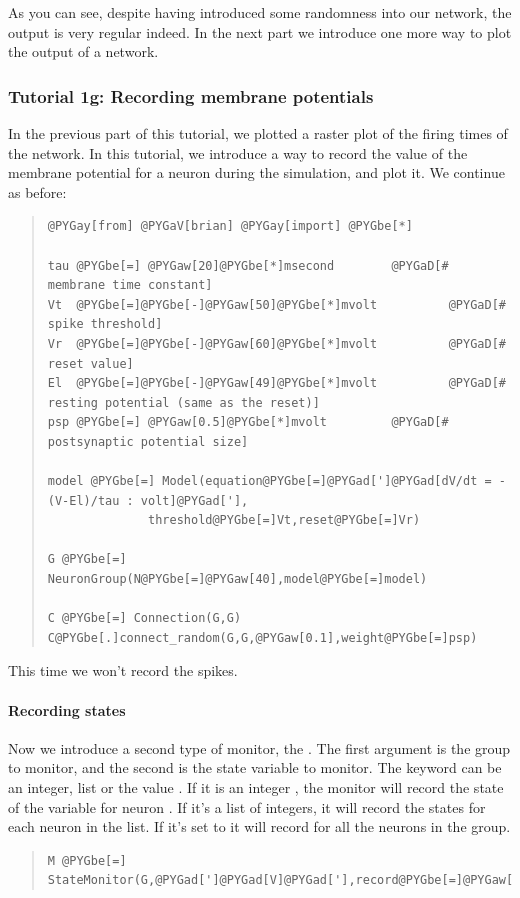 \documentclass[letterpaper,10pt]{manual}
\begin{document}
As you can see, despite having introduced some randomness into
our network, the output is very regular indeed. In the next part
we introduce one more way to plot the output of a network.

\resetcurrentobjects


\subsubsection{Tutorial 1g: Recording membrane potentials}

In the previous part of this tutorial, we plotted a raster plot of
the firing times of the network. In this tutorial, we introduce
a way to record the value of the membrane potential for a neuron
during the simulation, and plot it. We continue as before:
\begin{quote}

\begin{Verbatim}[commandchars=@\[\]]
@PYGay[from] @PYGaV[brian] @PYGay[import] @PYGbe[*]

tau @PYGbe[=] @PYGaw[20]@PYGbe[*]msecond        @PYGaD[# membrane time constant]
Vt  @PYGbe[=]@PYGbe[-]@PYGaw[50]@PYGbe[*]mvolt          @PYGaD[# spike threshold]
Vr  @PYGbe[=]@PYGbe[-]@PYGaw[60]@PYGbe[*]mvolt          @PYGaD[# reset value]
El  @PYGbe[=]@PYGbe[-]@PYGaw[49]@PYGbe[*]mvolt          @PYGaD[# resting potential (same as the reset)]
psp @PYGbe[=] @PYGaw[0.5]@PYGbe[*]mvolt         @PYGaD[# postsynaptic potential size]

model @PYGbe[=] Model(equation@PYGbe[=]@PYGad[']@PYGad[dV/dt = -(V-El)/tau : volt]@PYGad['],
              threshold@PYGbe[=]Vt,reset@PYGbe[=]Vr)

G @PYGbe[=] NeuronGroup(N@PYGbe[=]@PYGaw[40],model@PYGbe[=]model)

C @PYGbe[=] Connection(G,G)
C@PYGbe[.]connect_random(G,G,@PYGaw[0.1],weight@PYGbe[=]psp)
\end{Verbatim}
\end{quote}

This time we won't record the spikes.


\paragraph{Recording states}

Now we introduce a second type of monitor, the \hyperlink{brian.StateMonitor}{}.
The first argument is the group to monitor, and the second is
the state variable to monitor. The keyword  can be
an integer, list or the value . If it is an integer ,
the monitor will record the state of the variable for neuron .
If it's a list of integers, it will record the states for
each neuron in the list. If it's set to  it will record
for all the neurons in the group.
\begin{quote}

\begin{Verbatim}[commandchars=@\[\]]
M @PYGbe[=] StateMonitor(G,@PYGad[']@PYGad[V]@PYGad['],record@PYGbe[=]@PYGaw[0])
\end{Verbatim}
\end{quote}
\end{document}
